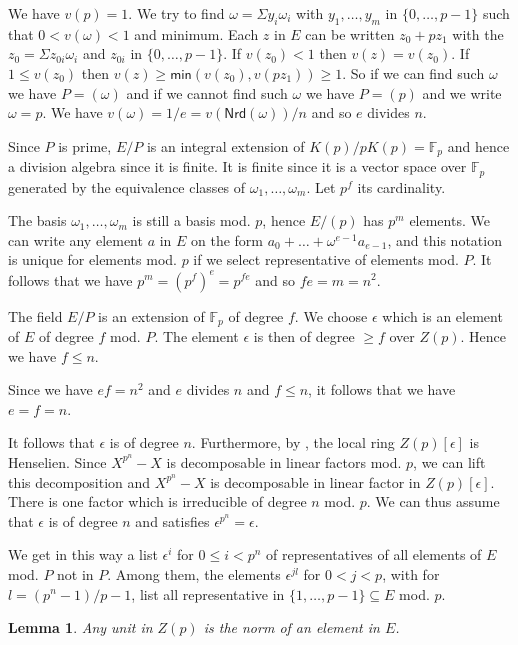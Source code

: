 \documentclass[10pt,a4paper]{article}
\newtheorem{lemma}{Lemma}[section]
\newcommand{\FF}{\mathbb{F}}
\newcommand\Min{\mathsf{min}}
\newcommand\Nmr{\mathsf{Nrd}}
\begin{document}
 We have $v(p) = 1$. We try to find $\omega = \Sigma y_i\omega_i$
 with $y_1,\dots, y_m$ in $\{0,\dots,p-1\}$ such that $0<v(\omega)<1$ and minimum.
 Each $z$ in $E$ can be written $z_0 + p z_1$ with the $z_0 = \Sigma z_{0i}\omega_i$ and $z_{0i}$
 in $\{0,\dots,p-1\}$. If $v(z_0) <1$ then $v(z) = v(z_0)$. If $1\leqslant v(z_0)$ then
 $v(z)\geqslant \Min(v(z_0),v(pz_1))\geqslant 1$. 
 So if we can find such $\omega$ we have $P = (\omega)$ and if we cannot find such $\omega$
 we have $P = (p)$ and we write $\omega = p$. We have $v(\omega) = 1/e = v(\Nmr(\omega))/n$
 and so $e$ divides $n$.

 Since $P$ is prime, $E/P$ is an integral extension of $K(p)/pK(p) = \FF_p$ and hence a division
 algebra since it is finite. It is finite since it is a vector space over $\FF_p$ generated by
 the equivalence classes of $\omega_1,\dots,\omega_m$. Let $p^f$ its cardinality.

 The basis $\omega_1,\dots,\omega_m$ is still a basis mod. $p$, hence $E/(p)$ has $p^m$ elements.
 We can write any element $a$ in $E$ on the form $a_0 + \dots + \omega^{e-1} a_{e-1}$, and this
 notation is unique for elements mod. $p$ if we select representative of elements mod. $P$.
 It follows that we have $p^m = (p^f)^e = p^{fe}$ and so $fe = m = n^2$.

 The field $E/P$ is an extension of $\FF_p$ of degree $f$. We choose $\epsilon$ which is an element of $E$
 of degree $f$ mod. $P$. The element $\epsilon$ is then of degree $\geqslant f$ over $Z(p)$. Hence we have
 $f\leqslant n$.

 Since we have $ef = n^2$ and $e$ divides $n$ and $f\leqslant n$, it follows that we have $e = f = n$.

 It follows that $\epsilon$ is of degree $n$. Furthermore, by \cite[Corollary 5.12]{ALP}, the local ring $Z(p)[\epsilon]$ is
 Henselien. Since $X^{p^n}-X$ is decomposable in linear factors mod. $p$, we can lift this decomposition
 and $X^{p^n}-X$ is decomposable in linear factor in $Z(p)[\epsilon]$. There is one factor which is
 irreducible of degree $n$ mod. $p$. We can thus assume that
 $\epsilon$ is of degree $n$ and satisfies $\epsilon^{p^n} = \epsilon$.

 We get in this way a list $\epsilon^i$ for $0\leqslant i<p^n$ of representatives of all elements of $E$ mod. $P$
 not in $P$. Among them, the elements $\epsilon^{jl}$ for $0< j<p$, with  for $l = (p^n-1)/p-1$,
 list all representative
 in $\{1,\dots,p-1\}\subseteq E$ mod. $p$.

 \begin{lemma}\label{unit}
 Any unit in $Z(p)$ is the norm of an element in $E$.   
 \end{lemma}
 
\end{document}
